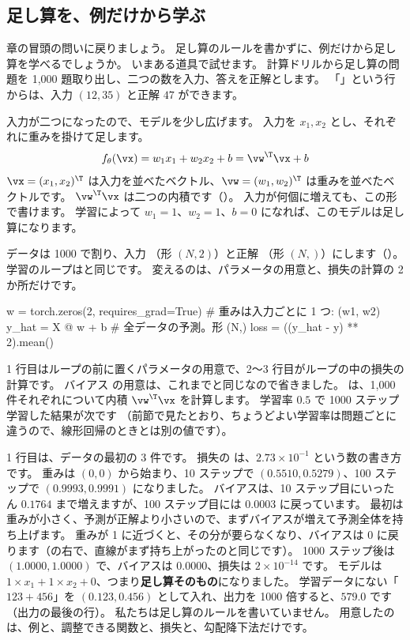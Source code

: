 \subsection*{足し算を、例だけから学ぶ}

章の冒頭の問いに戻りましょう。
足し算のルールを書かずに、例だけから足し算を学べるでしょうか。
いまある道具で試せます。
計算ドリルから足し算の問題を 1,000 題取り出し、二つの数を入力、答えを正解とします。
「」という行からは、入力 $(12, 35)$ と正解 $47$ ができます。

入力が二つになったので、モデルを少し広げます。
入力を $x_1, x_2$ とし、それぞれに重みを掛けて足します。
\begin{equation}
f_\theta(\vx) = w_1 x_1 + w_2 x_2 + b = \vw^\T\vx + b
\label{eq:ml-linear-multi}
\end{equation}
$\vx=(x_1,x_2)^\T$ は入力を並べたベクトル、$\vw=(w_1,w_2)^\T$ は重みを並べたベクトルです。
$\vw^\T\vx$ は二つの内積です（）。
入力が何個に増えても、この形で書けます。
学習によって $w_1=1$、$w_2=1$、$b=0$ になれば、このモデルは足し算になります。

データは 1000 で割り、入力 （形 $(N,2)$）と正解 （形 $(N,)$）にします（）。
学習のループはと同じです。
変えるのは、パラメータの用意と、損失の計算の 2 か所だけです。

\begin{pycode}
w = torch.zeros(2, requires_grad=True)  # 重みは入力ごとに 1 つ: (w1, w2)
y_hat = X @ w + b  # 全データの予測。形 (N,)
loss = ((y_hat - y) ** 2).mean()
\end{pycode}

1 行目はループの前に置くパラメータの用意で、2〜3 行目がループの中の損失の計算です。
バイアス  の用意は、これまでと同じなので省きました。
 は、1,000 件それぞれについて内積 $\vw^\T\vx$ を計算します。
学習率 $0.5$ で 1000 ステップ学習した結果が次です
（前節で見たとおり、ちょうどよい学習率は問題ごとに違うので、線形回帰のときとは別の値です）。


1 行目は、データの最初の 3 件です。
損失の  は、$2.73\times10^{-1}$ という数の書き方です。
重みは $(0,0)$ から始まり、10 ステップで $(0.5510, 0.5279)$、100 ステップで $(0.9993, 0.9991)$ になりました。
バイアスは、10 ステップ目にいったん $0.1764$ まで増えますが、100 ステップ目には $0.0003$ に戻っています。
最初は重みが小さく、予測が正解より小さいので、まずバイアスが増えて予測全体を持ち上げます。
重みが 1 に近づくと、その分が要らなくなり、バイアスは 0 に戻ります（の右で、直線がまず持ち上がったのと同じです）。
1000 ステップ後は $(1.0000, 1.0000)$ で、バイアスは $0.0000$、損失は $2\times10^{-14}$ です。
モデルは $1\times x_1 + 1\times x_2 + 0$、つまり\textbf{足し算そのもの}になりました。
学習データにない「$123+456$」を $(0.123, 0.456)$ として入れ、出力を 1000 倍すると、$579.0$ です（出力の最後の行）。
私たちは足し算のルールを書いていません。
用意したのは、例と、調整できる関数と、損失と、勾配降下法だけです。

